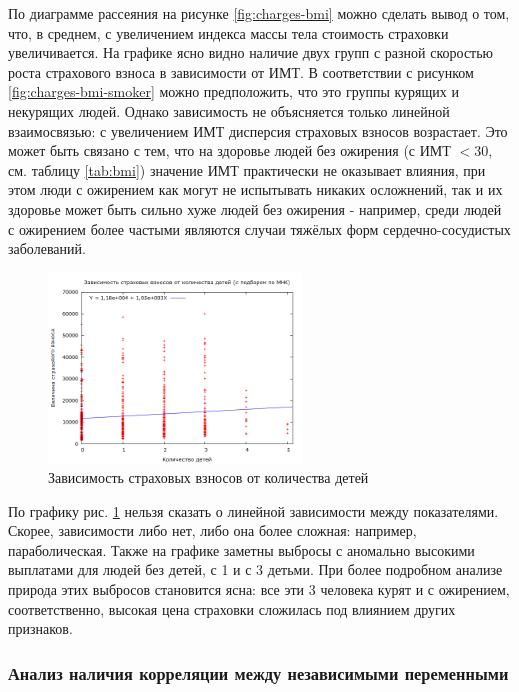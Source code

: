 \documentclass[a4paper,12pt]{article}
\begin{document}
По диаграмме рассеяния на рисунке \ref{fig:charges-bmi} можно сделать вывод о том, что, в среднем, с увеличением индекса массы тела стоимость страховки увеличивается. На графике ясно видно наличие двух групп с разной скоростью роста страхового взноса в зависимости от ИМТ. В соответствии с рисунком \ref{fig:charges-bmi-smoker} можно предположить, что это группы курящих и некурящих людей. Однако зависимость не объясняется только линейной взаимосвязью: с увеличением ИМТ дисперсия страховых взносов возрастает. Это может быть связано с тем, что на здоровье людей без ожирения (с ИМТ $<30$, см. таблицу \ref{tab:bmi}) значение ИМТ практически не оказывает влияния, при этом люди с ожирением как могут не испытывать никаких осложнений, так и их здоровье может быть сильно хуже людей без ожирения - например, среди людей с ожирением более частыми являются случаи тяжёлых форм сердечно-сосудистых заболеваний.

\begin{figure}[H]
	\includegraphics[width=0.6\textwidth]{../[graphics]/charges-children.png}
	\centering
	\caption{Зависимость страховых взносов от количества детей}
	\label{fig:charges-children}
\end{figure}

По графику рис. \ref{fig:charges-children} нельзя сказать о линейной зависимости между показателями. Скорее, зависимости либо нет, либо она более сложная: например, параболическая. Также на графике заметны выбросы с аномально высокими выплатами для людей без детей, с 1 и с 3 детьми. При более подробном анализе природа этих выбросов становится ясна: все эти 3 человека курят и с ожирением, соответственно, высокая цена страховки сложилась под влиянием других признаков.

\subsubsection{Анализ наличия корреляции между независимыми переменными}
\end{document}
